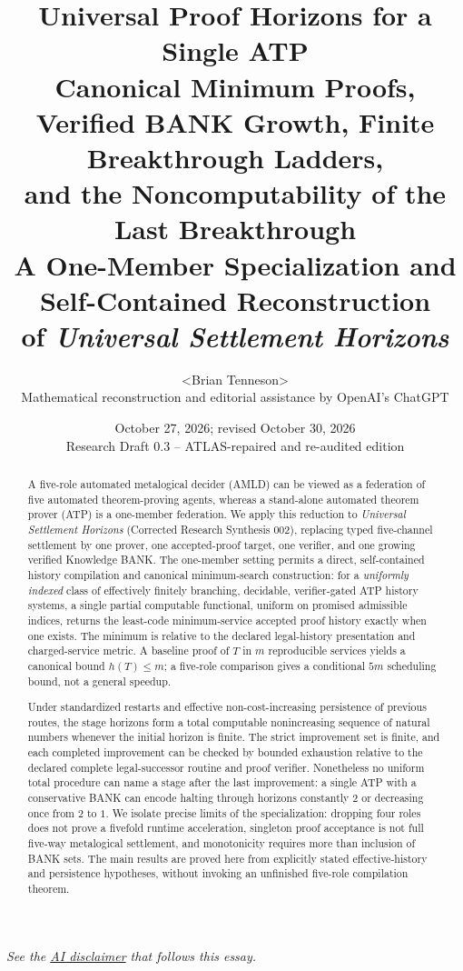 \documentclass[11pt]{article}
\title{\bfseries Universal Proof Horizons for a Single ATP\\[0.24em]
\large Canonical Minimum Proofs, Verified BANK Growth, Finite Breakthrough Ladders,\\
and the Noncomputability of the Last Breakthrough\\[0.35em]
\normalsize A One-Member Specialization and Self-Contained Reconstruction\\
of \emph{Universal Settlement Horizons}}
\author{\textless Brian Tenneson\textgreater\\[0.3em]
\small Mathematical reconstruction and editorial assistance by OpenAI's ChatGPT}
\date{October 27, 2026; revised October 30, 2026\\\small Research Draft 0.3 -- ATLAS-repaired and re-audited edition}
\theoremstyle{definition}
\begin{document}
\maketitle
\begin{center}
\small\emph{See the \hyperref[sec:ai-disclaimer]{AI disclaimer} that follows this essay.}
\end{center}
\vspace{0.3em}
\begin{abstract}
A five-role automated metalogical decider (AMLD) can be viewed as a federation of five automated theorem-proving agents, whereas a stand-alone automated theorem prover (ATP) is a one-member federation. We apply this reduction to \emph{Universal Settlement Horizons} (Corrected Research Synthesis 002), replacing typed five-channel settlement by one prover, one accepted-proof target, one verifier, and one growing verified Knowledge BANK. The one-member setting permits a direct, self-contained history compilation and canonical minimum-search construction: for a \emph{uniformly indexed} class of effectively finitely branching, decidable, verifier-gated ATP history systems, a single partial computable functional, uniform on promised admissible indices, returns the least-code minimum-service accepted proof history exactly when one exists. The minimum is relative to the declared legal-history presentation and charged-service metric. A baseline proof of $T$ in $m$ reproducible services yields a canonical bound $h(T)\le m$; a five-role comparison gives a conditional $5m$ scheduling bound, not a general speedup.

Under standardized restarts and effective non-cost-increasing persistence of previous routes, the stage horizons form a total computable nonincreasing sequence of natural numbers whenever the initial horizon is finite. The strict improvement set is finite, and each completed improvement can be checked by bounded exhaustion relative to the declared complete legal-successor routine and proof verifier. Nonetheless no uniform total procedure can name a stage after the last improvement: a single ATP with a conservative BANK can encode halting through horizons constantly $2$ or decreasing once from $2$ to $1$. We isolate precise limits of the specialization: dropping four roles does not prove a fivefold runtime acceleration, singleton proof acceptance is not full five-way metalogical settlement, and monotonicity requires more than inclusion of BANK sets. The main results are proved here from explicitly stated effective-history and persistence hypotheses, without invoking an unfinished five-role compilation theorem.
\end{abstract}
\end{document}
